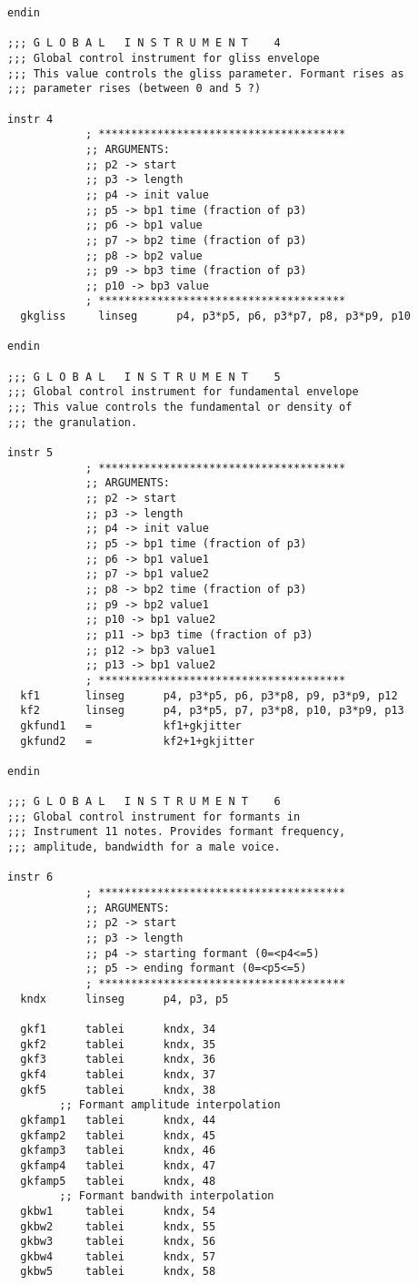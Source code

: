 \begin{verbatim}
endin 

;;; G L O B A L   I N S T R U M E N T    4
;;; Global control instrument for gliss envelope
;;; This value controls the gliss parameter. Formant rises as  
;;; parameter rises (between 0 and 5 ?)

instr 4
            ; **************************************
            ;; ARGUMENTS:
            ;; p2 -> start
            ;; p3 -> length
            ;; p4 -> init value
            ;; p5 -> bp1 time (fraction of p3)
            ;; p6 -> bp1 value
            ;; p7 -> bp2 time (fraction of p3)
            ;; p8 -> bp2 value
            ;; p9 -> bp3 time (fraction of p3)
            ;; p10 -> bp3 value
            ; **************************************
  gkgliss     linseg      p4, p3*p5, p6, p3*p7, p8, p3*p9, p10

endin 

;;; G L O B A L   I N S T R U M E N T    5
;;; Global control instrument for fundamental envelope
;;; This value controls the fundamental or density of 
;;; the granulation.

instr 5
            ; **************************************
        	;; ARGUMENTS:
            ;; p2 -> start
            ;; p3 -> length
            ;; p4 -> init value
            ;; p5 -> bp1 time (fraction of p3)
            ;; p6 -> bp1 value1
            ;; p7 -> bp1 value2
            ;; p8 -> bp2 time (fraction of p3)
            ;; p9 -> bp2 value1
            ;; p10 -> bp1 value2
            ;; p11 -> bp3 time (fraction of p3)
            ;; p12 -> bp3 value1
            ;; p13 -> bp1 value2
            ; **************************************
  kf1       linseg      p4, p3*p5, p6, p3*p8, p9, p3*p9, p12
  kf2       linseg      p4, p3*p5, p7, p3*p8, p10, p3*p9, p13
  gkfund1   =           kf1+gkjitter
  gkfund2   =           kf2+1+gkjitter

endin 

;;; G L O B A L   I N S T R U M E N T    6
;;; Global control instrument for formants in 
;;; Instrument 11 notes. Provides formant frequency,
;;; amplitude, bandwidth for a male voice.

instr 6
            ; **************************************
            ;; ARGUMENTS:
            ;; p2 -> start
            ;; p3 -> length
            ;; p4 -> starting formant (0=<p4<=5)
            ;; p5 -> ending formant (0=<p5<=5)
            ; **************************************
  kndx      linseg      p4, p3, p5

  gkf1      tablei      kndx, 34
  gkf2      tablei      kndx, 35
  gkf3      tablei      kndx, 36
  gkf4      tablei      kndx, 37
  gkf5      tablei      kndx, 38
        ;; Formant amplitude interpolation
  gkfamp1   tablei      kndx, 44
  gkfamp2   tablei      kndx, 45
  gkfamp3   tablei      kndx, 46
  gkfamp4   tablei      kndx, 47
  gkfamp5   tablei      kndx, 48
        ;; Formant bandwith interpolation
  gkbw1     tablei      kndx, 54
  gkbw2     tablei      kndx, 55
  gkbw3     tablei      kndx, 56
  gkbw4     tablei      kndx, 57
  gkbw5     tablei      kndx, 58


\end{verbatim}
